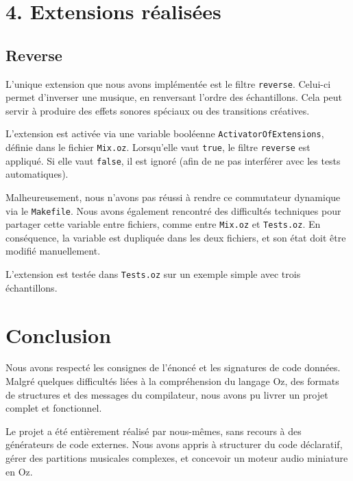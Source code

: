 \documentclass[a4paper,11pt]{article}
\begin{document}
\section*{4. Extensions réalisées}

\subsection*{Reverse}

L’unique extension que nous avons implémentée est le filtre \texttt{reverse}. Celui-ci permet d’inverser une musique, en renversant l’ordre des échantillons. Cela peut servir à produire des effets sonores spéciaux ou des transitions créatives.

L’extension est activée via une variable booléenne \texttt{ActivatorOfExtensions}, définie dans le fichier \texttt{Mix.oz}. Lorsqu’elle vaut \texttt{true}, le filtre \texttt{reverse} est appliqué. Si elle vaut \texttt{false}, il est ignoré (afin de ne pas interférer avec les tests automatiques).

Malheureusement, nous n'avons pas réussi à rendre ce commutateur dynamique via le \texttt{Makefile}. Nous avons également rencontré des difficultés techniques pour partager cette variable entre fichiers, comme entre \texttt{Mix.oz} et \texttt{Tests.oz}. En conséquence, la variable est dupliquée dans les deux fichiers, et son état doit être modifié manuellement.

L’extension est testée dans \texttt{Tests.oz} sur un exemple simple avec trois échantillons.

\section*{Conclusion}

Nous avons respecté les consignes de l’énoncé et les signatures de code données. Malgré quelques difficultés liées à la compréhension du langage Oz, des formats de structures et des messages du compilateur, nous avons pu livrer un projet complet et fonctionnel.

Le projet a été entièrement réalisé par nous-mêmes, sans recours à des générateurs de code externes. Nous avons appris à structurer du code déclaratif, gérer des partitions musicales complexes, et concevoir un moteur audio miniature en Oz.
\end{document}
